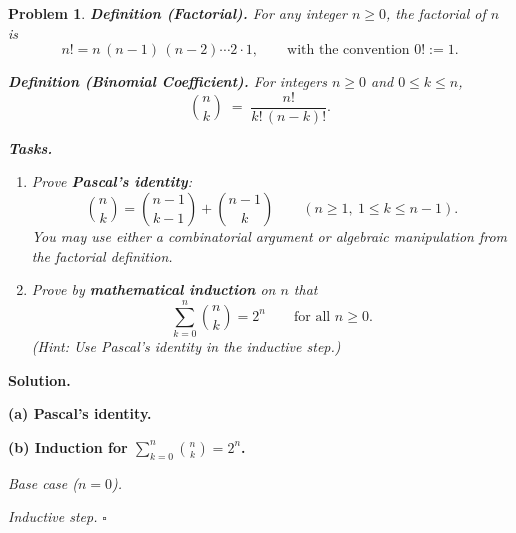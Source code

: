 \documentclass[9pt]{article}
\newtheorem{problem}{Problem}
\newenvironment{solution}{\par\noindent\textbf{Solution.}\ }{\hfill$\square$\par}
\begin{document}
\small
\begin{problem} \qquad
\newline
\textbf{Definition (Factorial).}
For any integer $n \ge 0$, the factorial of $n$ is
\[
n! = n\,(n-1)\,(n-2)\cdots 2\cdot 1,
\qquad \text{with the convention } 0! := 1.
\]

\medskip
\noindent
\textbf{Definition (Binomial Coefficient).}
For integers $n \ge 0$ and $0 \le k \le n$,
\[
\binom{n}{k} \;=\; \frac{n!}{k!\,(n-k)!}.
\]

\bigskip
\textbf{Tasks.}
\begin{enumerate}[label=\textbf{(\alph*)}]
  \item Prove \textbf{Pascal's identity}:
  \[
  \binom{n}{k}=\binom{n-1}{k-1}+\binom{n-1}{k}
  \qquad (n\ge 1,\ 1\le k\le n-1).
  \]
  You may use either a combinatorial argument or algebraic manipulation from the factorial definition.

  \item Prove by \textbf{mathematical induction} on $n$ that
  \[
  \sum_{k=0}^{n}\binom{n}{k}=2^n
  \qquad \text{for all } n\ge 0.
  \]
  (\emph{Hint:} Use Pascal's identity in the inductive step.)
\end{enumerate}
\end{problem}

\begin{solution}\qquad

\textbf{(a) Pascal's identity.}
\vfill

\textbf{(b) Induction for $\displaystyle \sum_{k=0}^{n}\binom{n}{k}=2^n$.}

\smallskip
\emph{Base case ($n=0$).}

\vfill
\emph{Inductive step.}
\end{solution}

\vfill
\vfill
\end{document}

